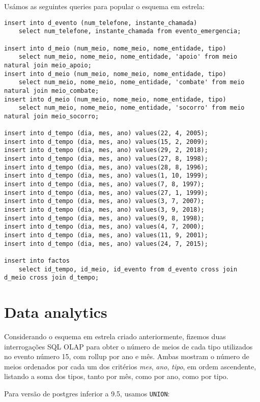 \documentclass[10pt,a4paper]{article}
\begin{document}
Usámos as seguintes queries para popular o esquema em estrela:

\begin{verbatim}
insert into d_evento (num_telefone, instante_chamada)
    select num_telefone, instante_chamada from evento_emergencia;

insert into d_meio (num_meio, nome_meio, nome_entidade, tipo)
    select num_meio, nome_meio, nome_entidade, 'apoio' from meio natural join meio_apoio;
insert into d_meio (num_meio, nome_meio, nome_entidade, tipo)
    select num_meio, nome_meio, nome_entidade, 'combate' from meio natural join meio_combate;
insert into d_meio (num_meio, nome_meio, nome_entidade, tipo)
    select num_meio, nome_meio, nome_entidade, 'socorro' from meio natural join meio_socorro;

insert into d_tempo (dia, mes, ano) values(22, 4, 2005);
insert into d_tempo (dia, mes, ano) values(15, 2, 2009);
insert into d_tempo (dia, mes, ano) values(29, 2, 2018);
insert into d_tempo (dia, mes, ano) values(27, 8, 1998);
insert into d_tempo (dia, mes, ano) values(28, 8, 1996);
insert into d_tempo (dia, mes, ano) values(1, 10, 1999);
insert into d_tempo (dia, mes, ano) values(7, 8, 1997);
insert into d_tempo (dia, mes, ano) values(27, 1, 1999);
insert into d_tempo (dia, mes, ano) values(3, 7, 2007);
insert into d_tempo (dia, mes, ano) values(3, 9, 2018);
insert into d_tempo (dia, mes, ano) values(9, 8, 1998);
insert into d_tempo (dia, mes, ano) values(4, 7, 2000);
insert into d_tempo (dia, mes, ano) values(11, 9, 2001);
insert into d_tempo (dia, mes, ano) values(24, 7, 2015);

insert into factos
    select id_tempo, id_meio, id_evento from d_evento cross join d_meio cross join d_tempo;
\end{verbatim}

\section{Data analytics}

Considerando o esquema em estrela criado anteriormente, fizemos duas interrogações
SQL OLAP para obter o número de meios de cada tipo utilizados no evento número 15, com
rollup por ano e mês. Ambas mostram o número de meios ordenados por cada um dos critérios
\textit{mes}, \textit{ano}, \textit{tipo}, em ordem ascendente, listando a soma dos tipos,
tanto por mês, como por ano, como por tipo.

Para versão de postgres inferior a 9.5, usamos \texttt{UNION}:
\end{document}
